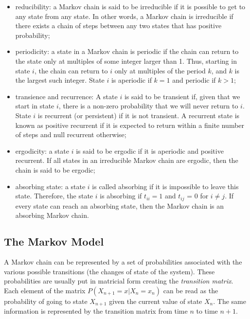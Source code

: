 \begin{itemize}
	\tightlist
	\item reducibility: a Markov chain is said to be irreducible if it is possible to get to any state from any state. In other words, a Markov chain is irreducible if there exists a chain of steps between any two states that has positive probability;
	\item periodicity: a state in a Markov chain is periodic if the chain can return to the state only at multiples of some integer larger than 1. Thus, starting in state $i$, the chain can return to $i$ only at multiples of the period $k$, and $k$ is the largest such integer. State $i$ is aperiodic if $k = 1$ and periodic if $k > 1$;	
	\item transience and recurrence: A state $i$ is said to be transient if, given that we start in state $i$, there is a non-zero probability that we will never return to $i$. State $i$ is recurrent (or persistent) if it is not transient. A recurrent state is known as positive recurrent if it is expected to return within a finite number of steps and null recurrent otherwise;
	\item ergodicity: a state $i$ is said to be ergodic if it is aperiodic and positive recurrent. If all states in an irreducible Markov chain are ergodic, then the chain is said to be ergodic;
	\item absorbing state: a state $i$ is called absorbing if it is impossible to leave this state. Therefore, the state $i$ is absorbing if $t_{ii} = 1$ and $t_{ij}$ = 0 for $i \neq j$. If every state can reach an absorbing state, then the Markov chain is an absorbing Markov chain.
\end{itemize}


\subsection{The Markov Model}
A Markov chain can be represented by a set of probabilities associated with the various possible transitions (the changes of state of the system). These probabilities are usually put in matricial form creating the \emph{transition matrix}.
Each element of the matrix $P(X_{n+1} = x | X_n = x_n)$ can be read as the probability of going to state $X_{n+1}$ given the current value of state $X_n$. The same information is represented by the transition matrix from time $n$ to time $n+1$.

